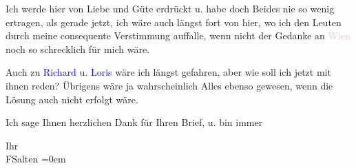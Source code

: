\pstart
           Ich werde hier von Liebe und {\pb}Güte erdrückt u. habe doch
               Beides nie so wenig ertragen, als gerade jetzt, ich wäre auch längst
               fort von hier, wo ich den Leuten durch meine consequente Verstimmung
               auffalle, wenn nicht der Gedanke an \textcolor{pink}{Wien}{}\ledrightnote{\textcolor{pink}{Wien}} noch so
               schrecklich für mich wäre.\pend
           
\pstart
           Auch zu \textcolor{blue}{Richard}{}\ledrightnote{\textcolor{blue}{Richard Beer-Hofmann}} u. \textcolor{blue}{Loris}{}\ledrightnote{\textcolor{blue}{Hugo von Hofmannsthal}} wäre ich
               längst gefahren, aber wie soll ich jetzt mit ihnen reden? Übrigens wäre ja wahrscheinlich
               Alles ebenso gewesen, wenn die Lösung auch nicht erfolgt wäre.\pend
           
\pstart
           Ich sage Ihnen herzlichen Dank für Ihren Brief, u. {\pb}bin
               immer\pend
           
\pstart
           Ihr {\\[\baselineskip]}\spacefill\mbox{FSalten}\pend
           \leftskip=0em{}\endnumbering{}  
      